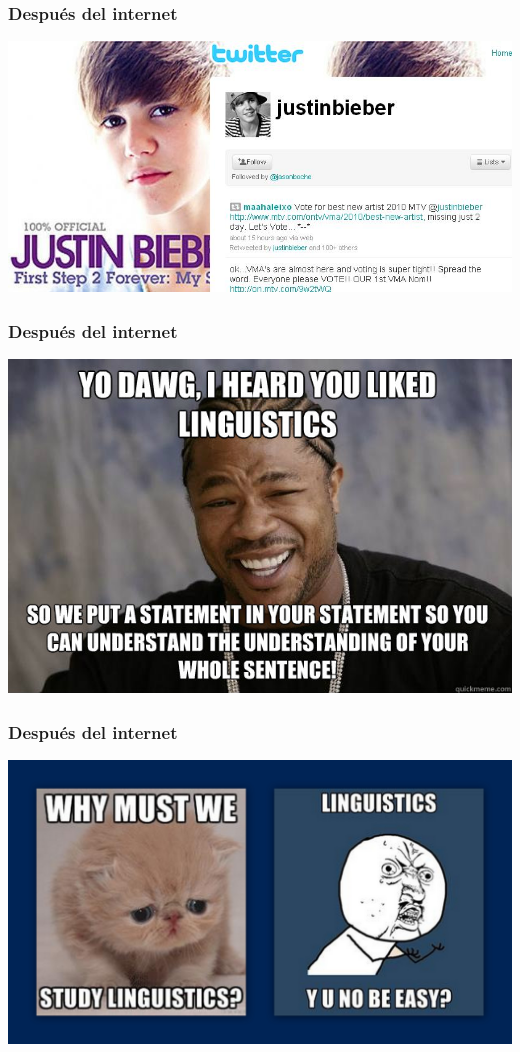 \documentclass{beamer}
\begin{document}
\begin{frame}
	\frametitle{Después del internet}

	\begin{center}
		\includegraphics[width=.9\textwidth]{figures/twitter.jpg}
	\end{center}
\end{frame}

\begin{frame}
	\frametitle{Después del internet}

	\begin{center}
		\includegraphics[width=.9\textwidth]{figures/memes1.jpg}
	\end{center}
\end{frame}

\begin{frame}
	\frametitle{Después del internet}

	\begin{center}
		\includegraphics[width=.9\textwidth]{figures/memes2.jpg}
	\end{center}
\end{frame}
\end{document}
